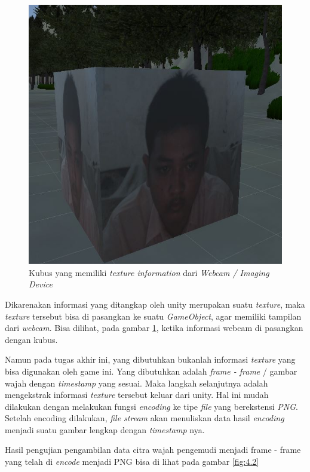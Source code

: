         \begin{figure}  [!htb]
	        \captionsetup{justification=centering}
	        \includegraphics[scale=0.62]{img/webcam-texture.JPG}
	        \caption{Kubus yang memiliki \textit{texture information} dari \textit{Webcam / Imaging Device}}
	        \label{fig: 3_26}
        \end{figure}
        
       Dikarenakan informasi yang ditangkap oleh unity merupakan suatu \textit{texture}, maka \textit{texture} tersebut bisa di pasangkan ke suatu \textit{GameObject}, agar memiliki tampilan dari \textit{webcam}.  Bisa dilihat, pada gambar \ref{fig: 3_26}, ketika informasi webcam di pasangkan dengan kubus.
       \par Namun pada tugas akhir ini, yang dibutuhkan bukanlah informasi \textit{texture} yang bisa digunakan oleh game ini. Yang dibutuhkan adalah \textit{frame - frame} / gambar wajah dengan \textit{timestamp} yang sesuai. Maka langkah selanjutnya adalah mengekstrak informasi \textit{texture} tersebut keluar dari unity. Hal ini mudah dilakukan dengan melakukan fungsi \textit{encoding} ke tipe \textit{file} yang berekstensi \textit{PNG}. Setelah encoding dilakukan, \textit{file stream} akan menuliskan data hasil \textit{encoding} menjadi suatu gambar lengkap dengan \textit{timestamp} nya.
       \par Hasil pengujian pengambilan data citra wajah pengemudi menjadi frame - frame yang telah di \textit{encode} menjadi PNG bisa di lihat pada gambar \ref{fig:4.2}
    
